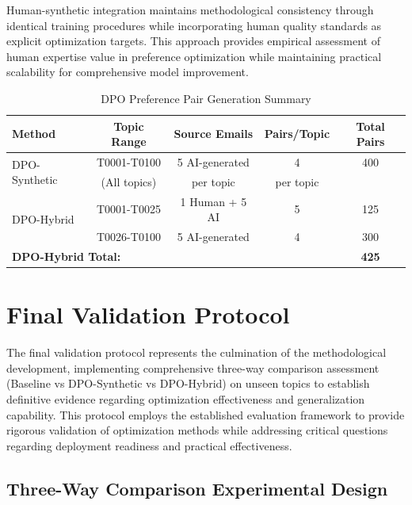 Human-synthetic integration maintains methodological consistency through identical training procedures while incorporating human quality standards as explicit optimization targets. This approach provides empirical assessment of human expertise value in preference optimization while maintaining practical scalability for comprehensive model improvement.

\begin{table}[htbp]
    \centering
    \begin{tabular}{|l|c|c|c|c|}
    \hline
    \textbf{Method} & \textbf{Topic Range} & \textbf{Source Emails} & \textbf{Pairs/Topic} & \textbf{Total Pairs} \\
    \hline
    \multirow{2}{*}{DPO-Synthetic} & T0001-T0100 & 5 AI-generated & 4 & 400 \\
    & (All topics) & per topic & per topic & \\
    \hline
    \multirow{2}{*}{DPO-Hybrid} & T0001-T0025 & 1 Human + 5 AI & 5 & 125 \\
    & T0026-T0100 & 5 AI-generated & 4 & 300 \\
    \hline
    \multicolumn{4}{|l|}{\textbf{DPO-Hybrid Total:}} & \textbf{425} \\
    \hline
    \end{tabular}
    \caption[DPO Preference Pair Generation Summary]{DPO Preference Pair Generation Summary}
    \label{tab:dpo-data-preparation}
\end{table}

\section{Final Validation Protocol}
\label{sec:final-validation-protocol}

The final validation protocol represents the culmination of the methodological development, implementing comprehensive three-way comparison assessment (Baseline vs DPO-Synthetic vs DPO-Hybrid) on unseen topics to establish definitive evidence regarding optimization effectiveness and generalization capability. This protocol employs the established evaluation framework to provide rigorous validation of optimization methods while addressing critical questions regarding deployment readiness and practical effectiveness.

\subsection{Three-Way Comparison Experimental Design}

